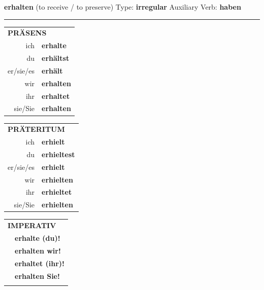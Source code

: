 \documentclass[10pt,a4paper]{revtex4-2}
\begin{document}
\begin{verbbox}
    {\Large \bf erhalten} (to receive / to preserve) \hfill Type: \textbf{irregular} \hfill Auxiliary Verb: \textbf{haben} 
    
     \vspace{5pt}

    \hrule
    
    \vspace{5pt}

  \begin{tabular}{rl}
     \multicolumn{2}{l}{\textbf{PRÄSENS} }\\
    ich & \textbf{erhalte}\\
    du & \textbf{erhältst}\\
    er/sie/es & \textbf{erhält}\\
    wir & \textbf{erhalten}\\
    ihr & \textbf{erhaltet}\\
    sie/Sie & \textbf{erhalten}\\
  \end{tabular}
  \hfill
     \begin{tabular}{rl}
    \multicolumn{2}{l}{\textbf{PRÄTERITUM} }\\
    ich & \textbf{erhielt}\\
    du & \textbf{erhieltest}\\
    er/sie/es & \textbf{erhielt}\\
    wir & \textbf{erhielten}\\
    ihr & \textbf{erhieltet}\\
    sie/Sie & \textbf{erhielten}\\
  \end{tabular}
  \hfill
  \begin{tabular}{rl}
     \multicolumn{2}{l}{\textbf{IMPERATIV} }\\
   & \textbf{erhalte (du)!}\\
   & \textbf{erhalten wir!}\\
   & \textbf{erhaltet (ihr)!}\\
   & \textbf{erhalten Sie!}\\
   & \vspace{10pt}
  \end{tabular}

    \vspace{10pt}


\end{verbbox}
\end{document}
